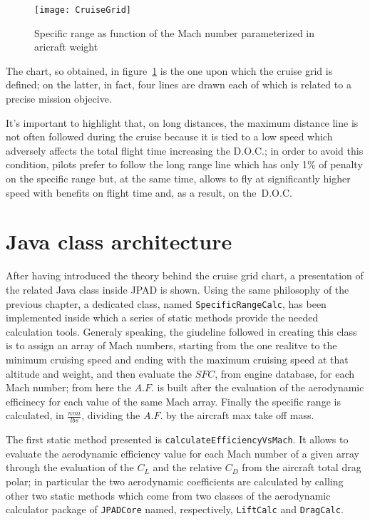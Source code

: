 \begin{figure}[b]
\centering
\texttt{[image: CruiseGrid]}
\caption{Specific range as function of the Mach number parameterized in aricraft weight}
\label{fig:Figure6}
\end{figure}

\bigskip
\noindent
The chart, so obtained, in figure~\ref{fig:Figure6} is the one upon which the cruise grid is defined; on the latter, in fact, four lines are drawn each of which is related to a precise mission objecive.

It's important to highlight that, on long distances, the maximum distance line is not often followed during the cruise because it is tied to a low speed which adversely affects the total flight time increasing the D.O.C.; in order to avoid this condition, pilots prefer to follow the long range line which has only 1\% of penalty on the specific range but, at the same time, allows to fly at significantly higher speed with benefits on flight time and, as a result, on the~D.O.C.


\section{Java class architecture}
After having introduced the theory behind the cruise grid chart, a presentation of the related Java class inside JPAD is shown. Using the same philosophy of the previous chapter, a dedicated class, named \lstinline[language=Java]!SpecificRangeCalc!, has been implemented inside which a series of static methods provide the needed calculation tools. Generaly speaking, the giudeline followed in creating this class is to assign an array of Mach numbers, starting from the one realitve to the minimum cruising speed and ending with the maximum cruising speed at that altitude and weight, and then evaluate the $SFC$, from engine database, for each Mach number; from here the $A.F.$ is built after the evaluation of the aerodynamic efficinecy for each value of the same Mach array. Finally the specific range is calculated, in $\frac{\si{nmi}}{\si{lbs}}$, dividing the $A.F.$ by the aircraft max take off mass.

\bigskip
\noindent
The first static method presented is \lstinline[language=Java]!calculateEfficiencyVsMach!. It allows to evaluate the aerodynamic efficiency value for each  Mach number of a given array through the evaluation of the $C_{L}$ and the relative $C_{D}$ from the aircraft total drag polar; in particular the two aerodynamic coefficients are calculated by calling other two static methods which come from two classes of the aerodynamic calculator package of \lstinline[language=Java]!JPADCore! named, respectively, \lstinline[language=Java]!LiftCalc! and \lstinline[language=Java]!DragCalc!.


